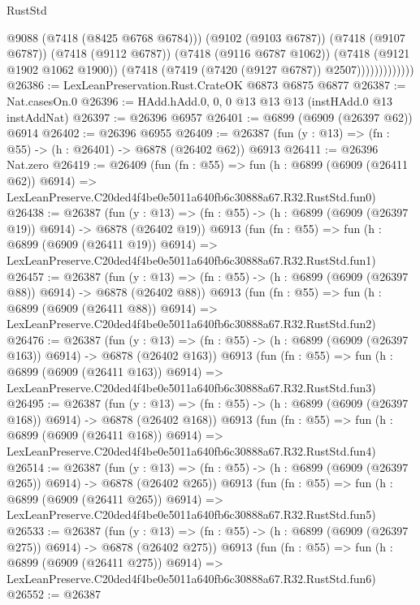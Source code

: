 \begin{lexlean}{RustStd}
\begin{coremodule}
                            @9088
                            (@7418 (@8425 @6768 @6784)))
                          (@9102 (@9103 @6787))
                          (@7418 (@9107 @6787))
                          (@7418 (@9112 @6787))
                          (@7418 (@9116 @6787 @1062))
                          (@7418 (@9121 @1902 @1062 @1900))
                          (@7418 (@7419 (@7420 (@9127 @6787)) @2507)))))))))))))
@26386 := LexLeanPreservation.Rust.CrateOK @6873 @6875 @6877
@26387 := Nat.casesOn.{0}
@26396 := HAdd.hAdd.{0, 0, 0} @13 @13 @13 (instHAdd.{0} @13 instAddNat)
@26397 := @26396 @6957
@26401 := @6899 (@6909 (@26397 @62)) @6914
@26402 := @26396 @6955
@26409 := @26387 (fun (y : @13) => (fn : @55) -> (h : @26401) -> @6878 (@26402 @62)) @6913
@26411 := @26396 Nat.zero
@26419 := @26409
    (fun (fn : @55) =>
    fun (h : @6899 (@6909 (@26411 @62)) @6914) =>
    LexLeanPreserve.C20ded4f4be0e5011a640fb6c30888a67.R32.RustStd.fun0)
@26438 := @26387
    (fun (y : @13) => (fn : @55) -> (h : @6899 (@6909 (@26397 @19)) @6914) -> @6878 (@26402 @19))
    @6913
    (fun (fn : @55) =>
    fun (h : @6899 (@6909 (@26411 @19)) @6914) =>
    LexLeanPreserve.C20ded4f4be0e5011a640fb6c30888a67.R32.RustStd.fun1)
@26457 := @26387
    (fun (y : @13) => (fn : @55) -> (h : @6899 (@6909 (@26397 @88)) @6914) -> @6878 (@26402 @88))
    @6913
    (fun (fn : @55) =>
    fun (h : @6899 (@6909 (@26411 @88)) @6914) =>
    LexLeanPreserve.C20ded4f4be0e5011a640fb6c30888a67.R32.RustStd.fun2)
@26476 := @26387
    (fun (y : @13) => (fn : @55) -> (h : @6899 (@6909 (@26397 @163)) @6914) -> @6878 (@26402 @163))
    @6913
    (fun (fn : @55) =>
    fun (h : @6899 (@6909 (@26411 @163)) @6914) =>
    LexLeanPreserve.C20ded4f4be0e5011a640fb6c30888a67.R32.RustStd.fun3)
@26495 := @26387
    (fun (y : @13) => (fn : @55) -> (h : @6899 (@6909 (@26397 @168)) @6914) -> @6878 (@26402 @168))
    @6913
    (fun (fn : @55) =>
    fun (h : @6899 (@6909 (@26411 @168)) @6914) =>
    LexLeanPreserve.C20ded4f4be0e5011a640fb6c30888a67.R32.RustStd.fun4)
@26514 := @26387
    (fun (y : @13) => (fn : @55) -> (h : @6899 (@6909 (@26397 @265)) @6914) -> @6878 (@26402 @265))
    @6913
    (fun (fn : @55) =>
    fun (h : @6899 (@6909 (@26411 @265)) @6914) =>
    LexLeanPreserve.C20ded4f4be0e5011a640fb6c30888a67.R32.RustStd.fun5)
@26533 := @26387
    (fun (y : @13) => (fn : @55) -> (h : @6899 (@6909 (@26397 @275)) @6914) -> @6878 (@26402 @275))
    @6913
    (fun (fn : @55) =>
    fun (h : @6899 (@6909 (@26411 @275)) @6914) =>
    LexLeanPreserve.C20ded4f4be0e5011a640fb6c30888a67.R32.RustStd.fun6)
@26552 := @26387

\end{coremodule}
\end{lexlean}
